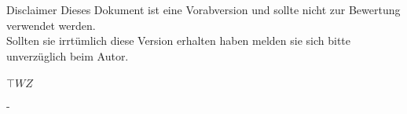 \thispagestyle{plain}


\begin{center}
\Large{Disclaimer}
Dieses Dokument ist eine Vorabversion und sollte nicht zur
Bewertung verwendet werden.\\Sollten sie irrtümlich diese Version
erhalten haben melden sie sich bitte unverzüglich beim Autor.\\\autor
\\
\Large{$\top W Z $}
\end{center}
\clearpage

\small
\noindent
-

